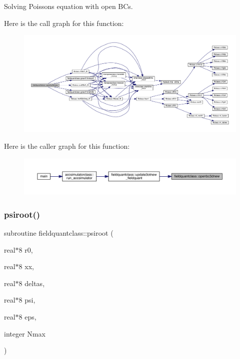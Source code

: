 Solving Poisson\textquotesingle{}s equation with open B\+Cs. 

Here is the call graph for this function\+:
\nopagebreak
\begin{figure}[H]
\begin{center}
\leavevmode
\includegraphics[width=350pt]{namespacefieldquantclass_aae4177005bffdb768a50a98b860c111a_cgraph}
\end{center}
\end{figure}
Here is the caller graph for this function\+:\nopagebreak
\begin{figure}[H]
\begin{center}
\leavevmode
\includegraphics[width=350pt]{namespacefieldquantclass_aae4177005bffdb768a50a98b860c111a_icgraph}
\end{center}
\end{figure}
\mbox{\label{namespacefieldquantclass_ae02f70d677d4bedfa6e41bd6cf33d612}} 
\subsubsection{\texorpdfstring{psiroot()}{psiroot()}}
{\footnotesize\ttfamily subroutine fieldquantclass\+::psiroot (\begin{DoxyParamCaption}\item[{real$\ast$8}]{r0,  }\item[{real$\ast$8}]{xx,  }\item[{real$\ast$8}]{deltas,  }\item[{real$\ast$8}]{psi,  }\item[{real$\ast$8}]{eps,  }\item[{integer}]{Nmax }\end{DoxyParamCaption})}




